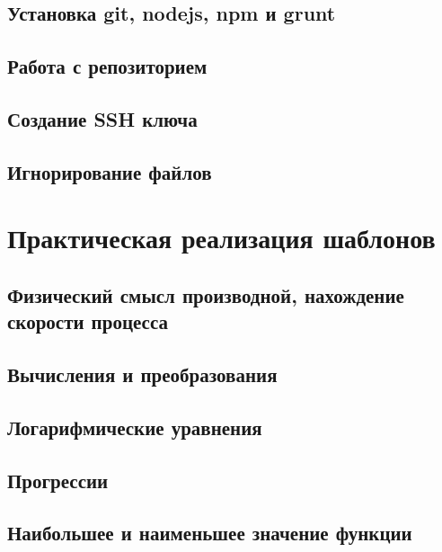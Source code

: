 \documentclass[oneside,final,14pt]{extarticle} %
\begin{document}
\subsection{Установка git, nodejs, npm и grunt}

\newpage

\subsection{Работа с репозиторием}

\newpage

\subsection{Создание SSH ключа}

\newpage

\subsection{Игнорирование файлов}

\newpage

\section{Практическая реализация шаблонов}
\subsection{Физический смысл производной, нахождение скорости процесса}

\newpage

\subsection{Вычисления и преобразования}

\newpage

\subsection{Логарифмические уравнения}

\newpage

\subsection{Прогрессии}

\newpage

\subsection{Наибольшее и наименьшее значение функции}

\newpage
\end{document}
